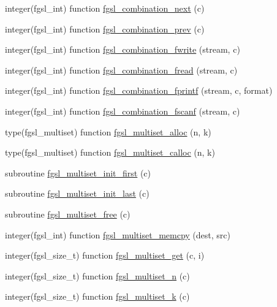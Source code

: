 \begin{DoxyCompactItemize}
\item 
integer(fgsl\+\_\+int) function \hyperlink{permutation_8finc_acf50f6a9728a138e3cbb1e014c047406}{fgsl\+\_\+combination\+\_\+next} (c)
\item 
integer(fgsl\+\_\+int) function \hyperlink{permutation_8finc_aee16ccc363b42c5bb4f5cda5cec21842}{fgsl\+\_\+combination\+\_\+prev} (c)
\item 
integer(fgsl\+\_\+int) function \hyperlink{permutation_8finc_a5c7269a8b592e3fd021ff35690d5c275}{fgsl\+\_\+combination\+\_\+fwrite} (stream, c)
\item 
integer(fgsl\+\_\+int) function \hyperlink{permutation_8finc_a40e24831c4b879f52d7923f0b3a8ea37}{fgsl\+\_\+combination\+\_\+fread} (stream, c)
\item 
integer(fgsl\+\_\+int) function \hyperlink{permutation_8finc_abf0711fb612be5f86dd06b31b26403b9}{fgsl\+\_\+combination\+\_\+fprintf} (stream, c, format)
\item 
integer(fgsl\+\_\+int) function \hyperlink{permutation_8finc_ad2dcdaa5e7550cdda2682f40367fba3a}{fgsl\+\_\+combination\+\_\+fscanf} (stream, c)
\item 
type(fgsl\+\_\+multiset) function \hyperlink{permutation_8finc_a7c55a19cb36e6d24c1937884a8d6c5b8}{fgsl\+\_\+multiset\+\_\+alloc} (n, k)
\item 
type(fgsl\+\_\+multiset) function \hyperlink{permutation_8finc_a9b60ad4de174107a2bb814fa946d2947}{fgsl\+\_\+multiset\+\_\+calloc} (n, k)
\item 
subroutine \hyperlink{permutation_8finc_ab2764f91fad296def839814aa48d405a}{fgsl\+\_\+multiset\+\_\+init\+\_\+first} (c)
\item 
subroutine \hyperlink{permutation_8finc_af11d68a8d9d59bc6b6a6ff371067a4c6}{fgsl\+\_\+multiset\+\_\+init\+\_\+last} (c)
\item 
subroutine \hyperlink{permutation_8finc_aecef1853cef964fa8dabf917628a2cf2}{fgsl\+\_\+multiset\+\_\+free} (c)
\item 
integer(fgsl\+\_\+int) function \hyperlink{permutation_8finc_a4ad5000e4797d1c096bc9c2b938bb3d8}{fgsl\+\_\+multiset\+\_\+memcpy} (dest, src)
\item 
integer(fgsl\+\_\+size\+\_\+t) function \hyperlink{permutation_8finc_a0d65011e4475e4b3b130e5c4e0dd7301}{fgsl\+\_\+multiset\+\_\+get} (c, i)
\item 
integer(fgsl\+\_\+size\+\_\+t) function \hyperlink{permutation_8finc_ab080e2383e519fc3bc3e1f8a09746867}{fgsl\+\_\+multiset\+\_\+n} (c)
\item 
integer(fgsl\+\_\+size\+\_\+t) function \hyperlink{permutation_8finc_a285143abab01c99704934281a8767baa}{fgsl\+\_\+multiset\+\_\+k} (c)

\end{DoxyCompactItemize}
